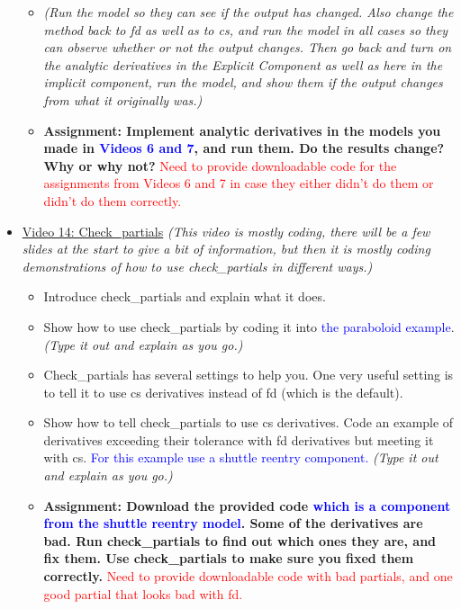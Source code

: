 \documentclass[12pt, letterpaper]{article}
\begin{document}
\begin{itemize}
\begin{itemize}
			\item \textit{(Run the model so they can see if the output has changed. Also change the method back to fd as well as to cs, and run the model in all cases so they can observe whether or not the output changes. Then go back and turn on the analytic derivatives in the Explicit Component as well as here in the implicit component, run the model, and show them if the output changes from what it originally was.)}
			\item \textbf{Assignment: Implement analytic derivatives in the models you made in \textcolor{blue}{Videos 6 and 7}, and run them. Do the results change? Why or why not?} \textcolor{red}{Need to provide downloadable code for the assignments from Videos 6 and 7 in case they either didn't do them or didn't do them correctly.}
		\end{itemize}

	\item \underline{Video 14: Check\_partials} \textit{(This video is mostly coding, there will be a few slides at the start to give a bit of information, but then it is mostly coding demonstrations of how to use check\_partials in different ways.)}
		\begin{itemize}
			\item Introduce check\_partials and explain what it does.
			\item Show how to use check\_partials by coding it into \textcolor{blue}{the paraboloid example}. \textit{(Type it out and explain as you go.)} 
			\item Check\_partials has several settings to help you. One very useful setting is to tell it to use cs derivatives instead of fd (which is the default).
			\item Show how to tell check\_partials to use cs derivatives. Code an example of derivatives exceeding their tolerance with fd derivatives but meeting it with cs. \textcolor{blue}{For this example use a shuttle reentry component.} \textit{(Type it out and explain as you go.)} 
			\item \textbf{Assignment: Download the provided code \textcolor{blue}{which is a component from the shuttle reentry model}. Some of the derivatives are bad. Run check\_partials to find out which ones they are, and fix them. Use check\_partials to make sure you fixed them correctly.} \textcolor{red}{Need to provide downloadable code with bad partials, and one good partial that looks bad with fd.}
		\end{itemize}


\end{itemize}
\end{document}
